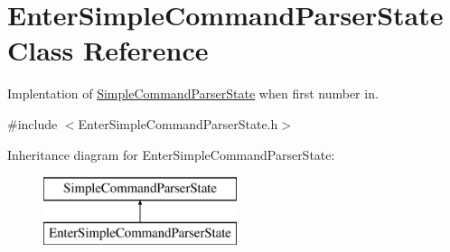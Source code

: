 \hypertarget{class_enter_simple_command_parser_state}{}\section{Enter\+Simple\+Command\+Parser\+State Class Reference}
\label{class_enter_simple_command_parser_state}


Implentation of \hyperlink{class_simple_command_parser_state}{Simple\+Command\+Parser\+State} when first number in.  




{\ttfamily \#include $<$Enter\+Simple\+Command\+Parser\+State.\+h$>$}

Inheritance diagram for Enter\+Simple\+Command\+Parser\+State\+:\begin{figure}[H]
\begin{center}
\leavevmode
\includegraphics[height=2.000000cm]{class_enter_simple_command_parser_state}
\end{center}
\end{figure}
